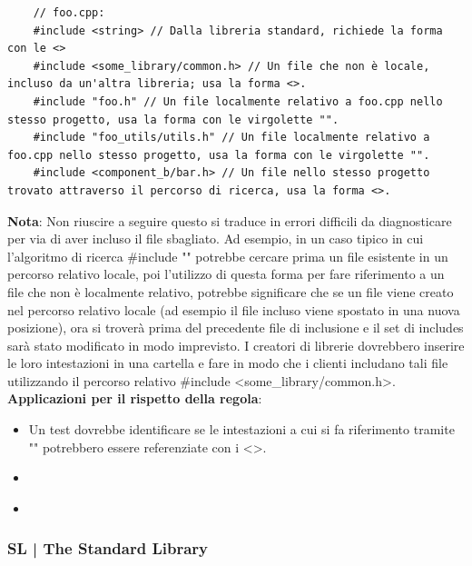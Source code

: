 \begin{lstlisting}
	// foo.cpp:
	#include <string> // Dalla libreria standard, richiede la forma con le <>
	#include <some_library/common.h> // Un file che non è locale, incluso da un'altra libreria; usa la forma <>.
	#include "foo.h" // Un file localmente relativo a foo.cpp nello stesso progetto, usa la forma con le virgolette "".
	#include "foo_utils/utils.h" // Un file localmente relativo a foo.cpp nello stesso progetto, usa la forma con le virgolette "".
	#include <component_b/bar.h> // Un file nello stesso progetto trovato attraverso il percorso di ricerca, usa la forma <>.
\end{lstlisting}

\textsf{\small \textbf{Nota}: Non riuscire a seguire questo si traduce in errori difficili da diagnosticare per via di aver incluso il file sbagliato. Ad esempio, in un caso tipico in cui l'algoritmo di ricerca \#include "" potrebbe cercare prima un file esistente in un percorso relativo locale, poi l'utilizzo di questa forma per fare riferimento a un file che non è localmente relativo, potrebbe significare che se un file viene creato nel percorso relativo locale (ad esempio il file incluso viene spostato in una nuova posizione), ora si troverà prima del precedente file di inclusione e il set di includes sarà stato modificato in modo imprevisto. I creatori di librerie dovrebbero inserire le loro intestazioni in una cartella e fare in modo che i clienti includano tali file utilizzando il percorso relativo \#include <some\_library/common.h>.} \\ %

\textsf{\small \textbf{Applicazioni per il rispetto della regola}: }

\begin{itemize}
	\item \textsf{\small Un test dovrebbe identificare se le intestazioni a cui si fa riferimento tramite "" potrebbero essere referenziate con i <>.}
	\item \textsf{\small }
	\item \textsf{\small }
\end{itemize}

\break


\subsubsection{SL | The Standard Library}

